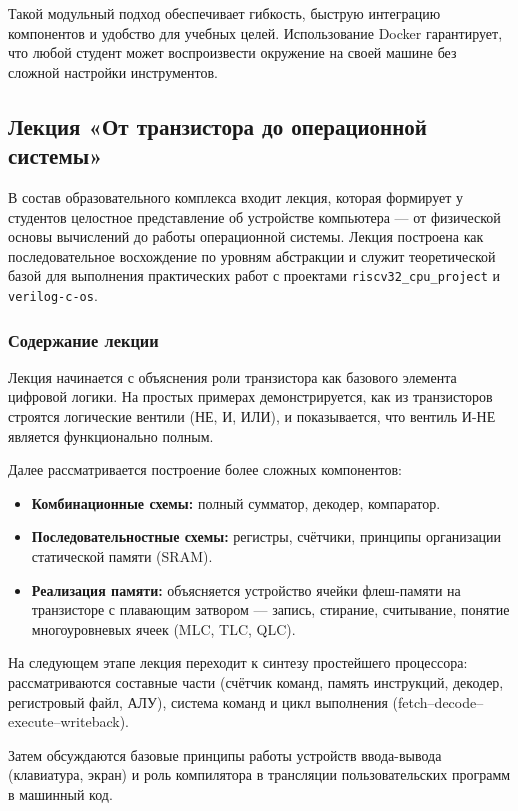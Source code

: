 Такой модульный подход обеспечивает гибкость, быструю интеграцию компонентов и удобство для учебных целей. Использование Docker гарантирует, что любой студент может воспроизвести окружение на своей машине без сложной настройки инструментов.

\subsection{Лекция «От транзистора до операционной системы»}

В состав образовательного комплекса входит лекция, которая формирует у студентов целостное представление об устройстве компьютера — от физической основы вычислений до работы операционной системы. Лекция построена как последовательное восхождение по уровням абстракции и служит теоретической базой для выполнения практических работ с проектами \texttt{riscv32\_cpu\_project} и \texttt{verilog-c-os}.

\subsubsection{Содержание лекции}

Лекция начинается с объяснения роли транзистора как базового элемента цифровой логики. На простых примерах демонстрируется, как из транзисторов строятся логические вентили (НЕ, И, ИЛИ), и показывается, что вентиль И-НЕ является функционально полным.

Далее рассматривается построение более сложных компонентов:
\begin{itemize}
    \item \textbf{Комбинационные схемы:} полный сумматор, декодер, компаратор.
    \item \textbf{Последовательностные схемы:} регистры, счётчики, принципы организации статической памяти (SRAM).
    \item \textbf{Реализация памяти:} объясняется устройство ячейки флеш-памяти на транзисторе с плавающим затвором — запись, стирание, считывание, понятие многоуровневых ячеек (MLC, TLC, QLC).
\end{itemize}

На следующем этапе лекция переходит к синтезу простейшего процессора: рассматриваются составные части (счётчик команд, память инструкций, декодер, регистровый файл, АЛУ), система команд и цикл выполнения (fetch–decode–execute–writeback).

Затем обсуждаются базовые принципы работы устройств ввода-вывода (клавиатура, экран) и роль компилятора в трансляции пользовательских программ в машинный код.

